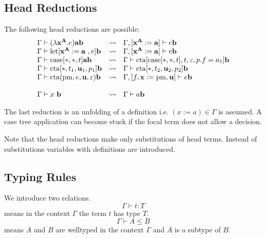 \subsection{Head Reductions}

The following head reductions are possible:
$$
\begin{array}{llll}
        \Gamma \vdash (\lambda \vec x^{\vec A}. e) \vec a \vec b
        &\reduce&
        \Gamma, [\vec x^{\vec A} := \vec a] \vdash e \vec b
        \\
        \Gamma \vdash \llet[\vec x^{\vec A} := \vec a , e] \vec b
        &\reduce&
        \Gamma, [\vec x^{\vec A} := \vec a] \vdash e \vec b
        \\
        \Gamma \vdash \case[*, *, t] \vec a \vec b
        &\reduce&
        \Gamma \vdash \cta[\case[*,*,t], t, \empty, p.f = a_1] \vec b
        \\
        \Gamma \vdash \cta[*, t_1, \vec u_1, p_1] \vec b
        &\reduce&
        \Gamma \vdash \cta[*, t_2, \vec u_2, p_2] \vec b
        \\
        \Gamma
        \vdash
        \cta(\text{pm}, e, \vec u, \empty) \vec b
        &\reduce&
        \Gamma, [f,\vec x := \text{pm}, \vec u]
        \vdash
        e \vec b
        \\
        \\
        \Gamma \vdash x \vec b
        &\reduce&
        \Gamma \vdash a \vec b
\end{array}
$$

The last reduction is an unfolding of a definition i.e. $(x:=a) \in \Gamma$ is
assumed. A case tree application can become stuck if the focal term does not
allow a decision.

Note that the head reductions make only substitutions of head terms. Instead of
substitutions variables with definitions are introduced.






\subsection{Typing Rules}

We introduce two relations.
$$
\Gamma \vdash t: T
$$
means in the context $\Gamma$ the term $t$ has type $T$.
$$
\Gamma \vdash A \le B
$$
means $A$ and $B$ are welltyped in the context $\Gamma$ and $A$ is a subtype of
$B$.





